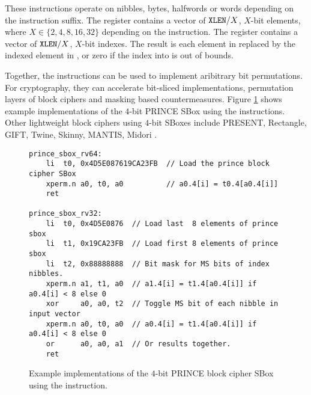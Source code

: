 These instructions operate on nibbles, bytes, halfwords or words
depending on the instruction suffix.
The \rsone register contains a vector of ${\tt XLEN}/X$, $X$-bit elements, where
$X \in \{2,4,8,16,32\}$ depending on the instruction.
The \rstwo register contains a vector of ${\tt XLEN}/X$, $X$-bit indexes.
The result is each element in \rstwo replaced by the indexed element
in \rsone, or zero if the index into \rstwo is out of bounds.

Together, the instructions can be used to implement aribitrary bit
permutations.
For cryptography, they can accelerate bit-sliced implementations,
permutation layers of block ciphers and masking based countermeasures.
Figure \ref{fig:example:xperm} shows example implementations of the
$4$-bit PRINCE SBox using the instructions.
Other lightweight block ciphers using $4$-bit SBoxes include
PRESENT\cite{block:present},
Rectangle\cite{block:rectangle},
GIFT\cite{block:gift},
Twine\cite{block:twine},
Skinny, MANTIS\cite{block:skinny},
Midori \cite{block:midori}.

\begin{figure}[h]
\begin{lstlisting}[style=ASM]
prince_sbox_rv64:
    li  t0, 0x4D5E087619CA23FB  // Load the prince block cipher SBox
    xperm.n a0, t0, a0          // a0.4[i] = t0.4[a0.4[i]]
    ret

prince_sbox_rv32:
    li  t0, 0x4D5E0876  // Load last  8 elements of prince sbox
    li  t1, 0x19CA23FB  // Load first 8 elements of prince sbox
    li  t2, 0x88888888  // Bit mask for MS bits of index nibbles.
    xperm.n a1, t1, a0  // a1.4[i] = t1.4[a0.4[i]] if a0.4[i] < 8 else 0
    xor     a0, a0, t2  // Toggle MS bit of each nibble in input vector
    xperm.n a0, t0, a0  // a0.4[i] = t1.4[a0.4[i]] if a0.4[i] < 8 else 0
    or      a0, a0, a1  // Or results together.
    ret
\end{lstlisting}
\caption{
    Example implementations of the $4$-bit PRINCE\cite{block:prince}
    block cipher SBox using the  instruction.
}
\label{fig:example:xperm}
\end{figure}
